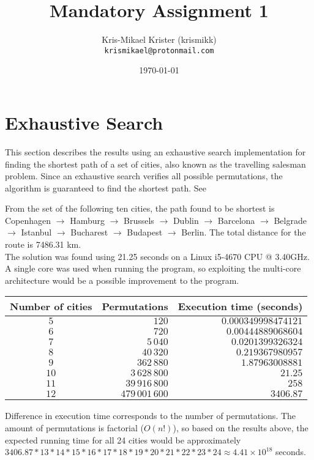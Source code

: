 \documentclass{article}
\title{Mandatory Assignment 1}
\author{Kris-Mikael Krister (krismikk)\\\texttt{krismikael@protonmail.com}}
\date{\today}
\begin{document}
\maketitle
\section*{Exhaustive Search}

This section describes the results using an exhaustive search implementation for finding the shortest path of a set of cities, also known as the travelling salesman problem. Since an exhaustive search verifies all possible permutations, the algorithm is guaranteed to find the shortest path. See

From the set of the following ten cities, the path found to be shortest is Copenhagen $\rightarrow$ Hamburg $\rightarrow$ Brussels $\rightarrow$ Dublin $\rightarrow$ Barcelona $\rightarrow$ Belgrade $\rightarrow$ Istanbul $\rightarrow$ Bucharest $\rightarrow$ Budapest $\rightarrow$ Berlin. The total distance for the route is 7486.31 km.\\

\noindent The solution was found using 21.25 seconds on a Linux i5-4670 CPU @ 3.40GHz. A single core was used when running the program, so exploiting the multi-core architecture would be a possible improvement to the program.\\

\begin{center}
\begin{tabular}{crr}
\toprule
Number of cities & Permutations & Execution time (seconds) \\
\midrule
$5$ & $120$ & $0.000349998474121$ \\
$6$ & $720$ & $0.00444889068604$ \\
$7$ & $5\,040$ & $0.0201399326324$ \\
$8$ & $40\,320$ & $0.219367980957$ \\
$9$ & $362\,880$ & $1.87963008881$ \\
$10$ & $3\,628\,800$ & $21.25$ \\
$11$ & $39\,916\,800$ & $258$ \\
$12$ & $479\,001\,600$ & $3406.87$ \\
\bottomrule
\end{tabular}
\end{center}

\noindent Difference in execution time corresponds to the number of permutations. The amount of permutations is factorial ($O(n!)$), so based on the results above, the expected running time for all 24 cities would be approximately $3406.87 * 13 * 14 * 15 * 16 * 17 * 18 * 19 * 20 * 21 * 22 * 23 * 24 \approx 4.41 \times 10^{18}$ seconds.
\end{document}
